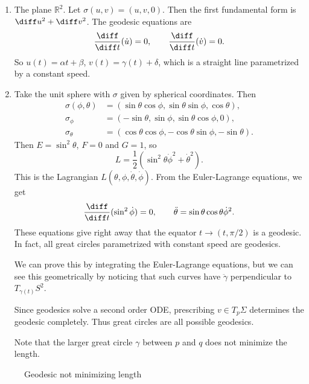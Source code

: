\documentclass[12pt]{article}
\begin{document}
\begin{exbox}
	\begin{enumerate}
		\item The plane $\mathbb{R}^2$. Let $\sigma(u, v) = (u, v, 0)$. Then the first fundamental form is $\diff u^2 + \diff v^2$. The geodesic equations are
			\[
			\frac{\diff}{\diff t}(\dot u) = 0, \qquad \frac{\diff}{\diff t} (\dot v) = 0.
			\]
			So $u(t) = \alpha t + \beta$, $v(t) = \gamma(t) + \delta$, which is a straight line parametrized by a constant speed.
		\item Take the unit sphere with $\sigma$ given by spherical coordinates. Then
			\begin{align*}
				\sigma(\phi, \theta) &= (\sin \theta \cos \phi, \sin \theta \sin \phi, \cos \theta), \\
				\sigma_\phi &= (- \sin \theta, \sin \phi, \sin \theta \cos \phi, 0), \\
				\sigma_{\theta} &= (\cos \theta \cos \phi, - \cos \theta \sin \phi, - \sin \theta).
			\end{align*}
			Then $E = \sin^2\theta$, $F = 0$ and $G = 1$, so
			\[
			L = \frac{1}{2} (\sin^2 \theta \dot \phi^2 + \dot \theta^2).
			\]
			This is the Lagrangian $L(\theta, \phi, \dot \theta, \dot \phi)$. From the Euler-Lagrange equations, we get
			\[
			\frac{\diff}{\diff t}(\sin^2 \dot \phi) = 0, \qquad \ddot \theta = \sin \theta \cos \theta \dot \phi^2.
			\]
			These equations give right away that the equator $t \to (t, \pi/2)$ is a geodesic. In fact, all great circles parametrized with constant speed are geodesics.

			We can prove this by integrating the Euler-Lagrange equations, but we can see this geometrically by noticing that such curves have $\ddot \gamma$ perpendicular to $T_{\gamma(t)}S^2$.

			Since geodesics solve a second order ODE, prescribing $v \in T_p\Sigma$ determines the geodesic completely. Thus great circles are all possible geodesics.

			Note that the larger great circle $\gamma$ between $p$ and $q$ does not minimize the length.
	\end{enumerate}
\end{exbox}

\begin{figure}[h]
	\centering
	\caption{Geodesic not minimizing length}
	\label{fig:long_geodesic}
\end{figure}
\end{document}
